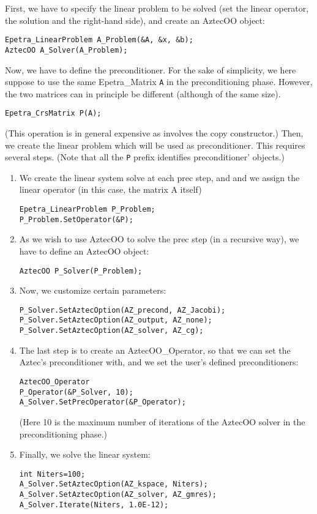 First, we have to specify the linear problem to be solved (set the
linear operator, the solution and the right-hand side), and create an
AztecOO object:
\begin{verbatim}
Epetra_LinearProblem A_Problem(&A, &x, &b);
AztecOO A_Solver(A_Problem);
\end{verbatim}
Now, we have to define the preconditioner. For the sake of simplicity,
we here suppose to use the same Epetra\_Matrix \verb!A! in the
preconditioning phase. However, the two matrices can in principle be
different (although of the same size).
\begin{verbatim}
Epetra_CrsMatrix P(A);
\end{verbatim}
(This operation is in general expensive as involves the copy
constructor.)  Then, we create the linear problem which will be used as
preconditioner.  This requires several steps.  (Note that all the
\verb!P! prefix identifies preconditioner' objects.)
\begin{enumerate}
\item We create the linear system solve at each prec step, and and we
  assign the linear operator (in this case, the matrix A itself)
\begin{verbatim}
Epetra_LinearProblem P_Problem;
P_Problem.SetOperator(&P);
\end{verbatim}
\item As we wish to use AztecOO to solve the prec step (in a recursive
  way), we have to define an AztecOO object:
\begin{verbatim}
AztecOO P_Solver(P_Problem);  
\end{verbatim}
\item Now, we customize certain parameters:
\begin{verbatim}
P_Solver.SetAztecOption(AZ_precond, AZ_Jacobi);
P_Solver.SetAztecOption(AZ_output, AZ_none);
P_Solver.SetAztecOption(AZ_solver, AZ_cg);
\end{verbatim}
\item The last step is to create an AztecOO\_Operator, so that we can set
  the Aztec's preconditioner with, and we set the user's defined
  preconditioners:
\begin{verbatim}
AztecOO_Operator
P_Operator(&P_Solver, 10);  
A_Solver.SetPrecOperator(&P_Operator);
\end{verbatim}
(Here 10 is the maximum number of iterations of the AztecOO solver in
the preconditioning phase.)
\item Finally, we solve the linear system:
\begin{verbatim}
int Niters=100;
A_Solver.SetAztecOption(AZ_kspace, Niters);
A_Solver.SetAztecOption(AZ_solver, AZ_gmres);
A_Solver.Iterate(Niters, 1.0E-12);  
\end{verbatim}
\end{enumerate}

